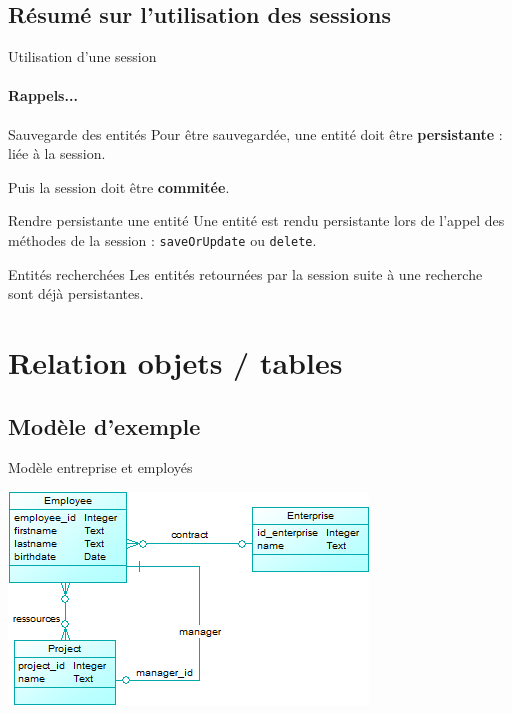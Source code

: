 \documentclass[compact]{beamer}%
\begin{document}
\subsection{Résumé sur l'utilisation des sessions}

\begin{frame}{Utilisation d'une session}
	\framesubtitle{Rappels...}
	
	\begin{block}{Sauvegarde des entités}
	Pour être sauvegardée, une entité doit être \textbf{persistante} : liée à la session.\par
	Puis la session doit être \textbf{commitée}.
	\end{block}
	
	\pause
	\begin{block}{Rendre persistante une entité}
	Une entité est rendu persistante lors de l'appel des méthodes de la session : \texttt{saveOrUpdate} ou \texttt{delete}.
	\end{block}
	
	\pause
	\begin{block}{Entités recherchées}
	Les entités retournées par la session suite à une recherche sont déjà persistantes.
	\end{block}	
\end{frame}
	
\section{Relation objets / tables}

\subsection{Modèle d'exemple}

\begin{frame}{Modèle entreprise et employés}
	\begin{center}
	\includegraphics{images/model_employees_full.png}	
	\end{center}
\end{frame}
\end{document}
